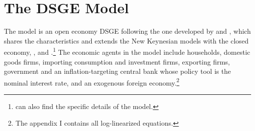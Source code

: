 \documentclass[12pt,oneside,a4paper]{article}
\begin{document}
\section{The DSGE Model }

The model is an open economy DSGE following the one developed by \citet{Adolfson:2007} and \citet{Adolfson:2008}, which shares the characteristics and extends the New Keynesian models with the closed economy, \citet{Christiano:2005}, \citet{Altig:2011} and \citet{Smets:2003}.\footnote{\citet{Ninmark:2011} can also find the specific details of the model.} The economic agents in the model include  households, domestic goods firms, importing consumption and investment firms, exporting firms, government and an inflation-targeting central bank whose policy tool is the nominal interest rate, and an exogenous foreign economy.\footnote{The appendix I contains all log-linearized equations.} 




\end{document}

